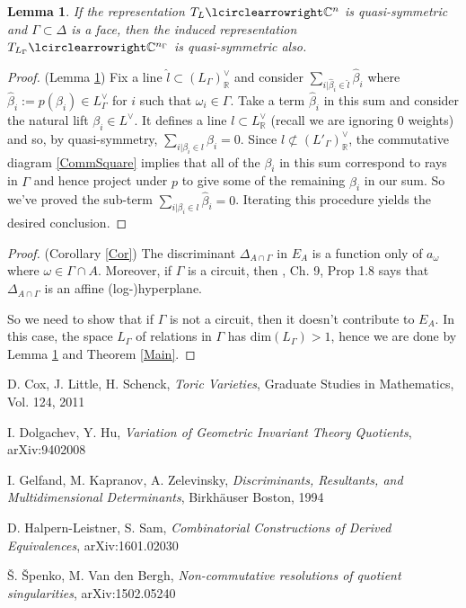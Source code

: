 \documentclass[a4paper]{article}
\theoremstyle{plain}
\newtheorem{lem}[thm]{Lemma}
\theoremstyle{definition}
\theoremstyle{remark}
\begin{document}
\begin{lem}
If the representation $T_L \lcirclearrowright \mathbb{C}^n$ is quasi-symmetric and $\Gamma \subset \Delta$ is a face, then the induced representation $T_{L_{\Gamma}} \lcirclearrowright \mathbb{C}^{n_{\Gamma}}$ is quasi-symmetric also.
\label{Inherit}
\end{lem}

\begin{proof}{(Lemma \ref{Inherit})}
Fix a line $\hat{l} \subset (L_{\Gamma})_{\mathbb{R}}^{\vee}$ and consider $\sum_{i| \hat{\beta}_i \in \hat{l}} \hat{\beta}_i$ where $\hat{\beta}_i:=p(\beta_i) \in L_{\Gamma}^{\vee}$ for $i$ such that $\omega_i \in \Gamma$. Take a term $\hat{\beta}_i$ in this sum and consider the natural lift $\beta_i \in L^{\vee}$. It defines a line $l \subset L^{\vee}_{\mathbb{R}}$ (recall we are ignoring 0 weights) and so, by quasi-symmetry, $\sum_{i| \beta_i \in l} \beta_i=0$. Since $l \nsubset (L'_{\Gamma})_{\mathbb{R}}^{\vee}$, the commutative diagram \eqref{CommSquare} implies that all of the $\beta_i$ in this sum correspond to rays in $\Gamma$ and hence project under $p$ to give some of the remaining $\hat{\beta}_i$ in our sum. So we've proved the sub-term $\sum_{i | \beta_i \in l} \hat{\beta}_i=0$. Iterating this procedure yields the desired conclusion.
\end{proof}

\begin{proof}{(Corollary \ref{Cor})}
The discriminant $\Delta_{A \cap \Gamma}$ in $E_A$ is a function only of $a_{\omega}$ where $\omega \in \Gamma \cap A$. Moreover, if $\Gamma$ is a circuit, then \cite{GKZ}, Ch. 9, Prop 1.8 says that $\Delta_{A \cap \Gamma}$ is an affine (log-)hyperplane. 

So we need to show that if $\Gamma$ is not a circuit, then it doesn't contribute to $E_A$. In this case, the space $L_{\Gamma}$ of relations in $\Gamma$ has $\text{dim}(L_{\Gamma})>1$, hence we are done by Lemma \ref{Inherit} and Theorem \ref{Main}.     
\end{proof}
 
 
\begin{thebibliography}{9}

 D. Cox, J. Little, H. Schenck, \textit{Toric Varieties}, Graduate Studies in Mathematics, Vol. 124, 2011

 I. Dolgachev, Y. Hu, \textit{Variation of Geometric Invariant Theory Quotients}, arXiv:9402008

 I. Gelfand, M. Kapranov, A. Zelevinsky, \textit{Discriminants, Resultants, and Multidimensional Determinants}, Birkh\"auser Boston, 1994

 D. Halpern-Leistner, S. Sam, \textit{Combinatorial Constructions of Derived Equivalences}, arXiv:1601.02030

 \v{S}. \v{S}penko, M. Van den Bergh, \textit{Non-commutative resolutions of quotient singularities},	arXiv:1502.05240

\end{thebibliography}
\end{document}
